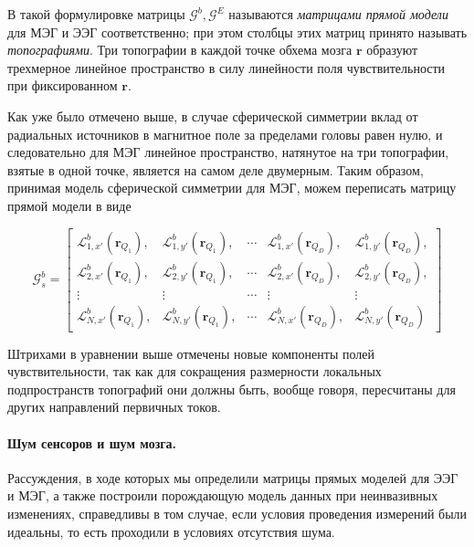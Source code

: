 В такой формулировке матрицы $\mathcal{G}^b, \mathcal{G}^E$ называются \emph{матрицами прямой модели} для МЭГ и ЭЭГ соответственно;
при этом столбцы этих матриц принято называть \emph{топографиями}. Три топографии в каждой точке обхема мозга $\mathbf{r}$
образуют трехмерное линейное пространство в силу линейности поля чувствительности при фиксированном $\mathbf{r}$.

Как уже было отмечено выше, в случае сферической симметрии вклад от радиальных источников в магнитное поле за пределами головы
равен нулю, и следовательно для МЭГ линейное пространство, натянутое на три топографии, взятые в одной точке, является
на самом деле двумерным. Таким образом, принимая модель сферической симметрии для МЭГ, можем переписать матрицу прямой модели в виде

\begin{equation}
    \mathcal{G}^b_{s} =
    \begin{bmatrix}
        \mathcal{L}_{1,x'}^b(\mathbf{r}_{Q_1}), & \mathcal{L}_{1,y'}^b(\mathbf{r}_{Q_1}), &
        \cdots &
        \mathcal{L}_{1,x'}^b(\mathbf{r}_{Q_D}), & \mathcal{L}_{1,y'}^b(\mathbf{r}_{Q_D}), \\
        \mathcal{L}_{2,x'}^b(\mathbf{r}_{Q_1}), & \mathcal{L}_{2,y'}^b(\mathbf{r}_{Q_1}), &
        \cdots &
        \mathcal{L}_{2,x'}^b(\mathbf{r}_{Q_D}), & \mathcal{L}_{2,y'}^b(\mathbf{r}_{Q_D}), \\
        \vdots                                    & \vdots                                    &
        \cdots &
        \vdots                                    & \vdots                                    \\
        \mathcal{L}_{N,x'}^b(\mathbf{r}_{Q_1}), & \mathcal{L}_{N,y'}^b(\mathbf{r}_{Q_1}), &
        \cdots &
        \mathcal{L}_{N,x'}^b(\mathbf{r}_{Q_D}), & \mathcal{L}_{N,y'}^b(\mathbf{r}_{Q_D})
    \end{bmatrix}
\end{equation}

Штрихами в уравнении выше отмечены новые компоненты полей чувствительности, так как для сокращения размерности
локальных подпространств топографий они должны быть, вообще говоря,
пересчитаны для других направлений первичных токов.

\paragraph{Шум сенсоров и шум мозга.}
Рассуждения, в ходе которых мы определили матрицы прямых моделей для ЭЭГ и МЭГ, а также
построили порождающую модель данных при неинвазивных изменениях, справедливы в том случае, если
условия проведения измерений были идеальны, то есть проходили в условиях отсутствия шума.


